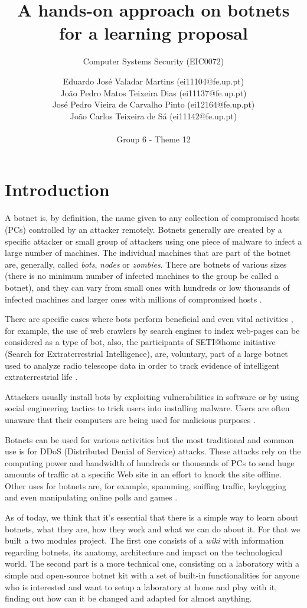 \documentclass[]{article}
\title{A hands-on approach on botnets for a learning proposal\\}
\subtitle{
	Computer Systems Security (EIC0072)
}
\author{Eduardo José Valadar Martins (ei11104@fe.up.pt)\\
	João Pedro Matos Teixeira Dias (ei11137@fe.up.pt)\\
	José Pedro Vieira de Carvalho Pinto (ei12164@fe.up.pt)\\
	João Carlos Teixeira de Sá (ei11142@fe.up.pt)\\\\Group 6 - Theme 12\\
}
\begin{document}
\maketitle
\thispagestyle{empty}
\newpage

\tableofcontents
\newpage
\section{Introduction}

A botnet is, by definition, the name given to any collection of compromised hosts (PCs) controlled by an attacker remotely. Botnets generally are created by a specific attacker or small group of attackers using one piece of malware to infect a large number of machines. The individual machines that are part of the botnet are, generally, called \textit{bots}, \textit{nodes} or \textit{zombies}. There are botnets of various sizes (there is no minimum number of infected machines to the group be called a botnet), and they can vary from small ones with hundreds or low thousands of infected machines and larger ones with millions of compromised hosts \cite{website:botnet-def}.

There are specific cases where bots perform beneficial and even vital activities \cite{website:botnet-useful}, for example, the use of web crawlers by search engines to index web-pages can be considered as a type of bot, also, the participants of SETI@home initiative (Search for Extraterrestrial Intelligence), are, voluntary, part of a large botnet used to analyze radio telescope data in order to track evidence of intelligent extraterrestrial life \cite{website:setihome}.

Attackers usually install bots by exploiting vulnerabilities in software or by using social engineering tactics to trick users into installing malware. Users are often unaware that their computers are being used for malicious purposes \cite{website:botnet-useful}.

Botnets can be used for various activities but the most traditional and common use is for DDoS (Distributed Denial of Service) attacks. These attacks rely on the computing power and bandwidth of hundreds or thousands of PCs to send huge amounts of traffic at a specific Web site in an effort to knock the site offline. Other uses for botnets are, for example, spamming, sniffing traffic, keylogging and even manipulating online polls and games \cite{article:honeypot-tracking}. 

As of today, we think that it's essential that there is a simple way to learn about botnets, what they are, how they work and what we can do about it. For that we built a two modules project. The first one consists of a \textit{wiki} with information regarding botnets, its anatomy, architecture and impact on the technological world. The second part is a more technical one, consisting on a laboratory with a simple and open-source botnet kit with a set of built-in functionalities for anyone who is interested and want to setup a laboratory at home and play with it, finding out how can it be changed and adapted for almost anything.
\end{document}
